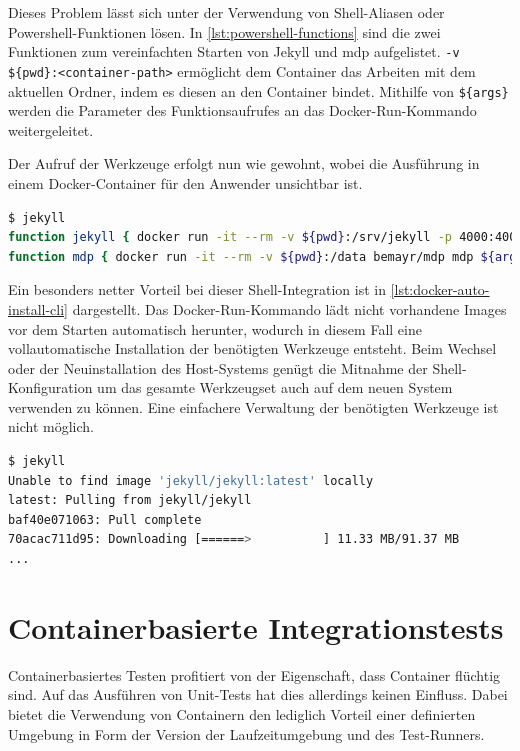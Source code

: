 Dieses Problem lässt sich unter der Verwendung von Shell-Aliasen oder Powershell-Funktionen lösen.
In \cref{lst:powershell-functions} sind die zwei Funktionen zum vereinfachten Starten von Jekyll und mdp aufgelistet.
\texttt{-v \$\{pwd\}:<container-path>} ermöglicht dem Container das Arbeiten mit dem aktuellen Ordner, indem es diesen an den Container bindet.
Mithilfe von \texttt{\$\{args\}} werden die Parameter des Funktionsaufrufes an das Docker-Run-Kommando weitergeleitet.

Der Aufruf der Werkzeuge erfolgt nun wie gewohnt, wobei die Ausführung in einem Docker-Container für den Anwender unsichtbar ist.

\begin{lstlisting}[caption=Powershell-Funktionen für Docker-Kommandos, language=bash, label=lst:powershell-functions]
$ jekyll
function jekyll { docker run -it --rm -v ${pwd}:/srv/jekyll -p 4000:4000 jekyll/jekyll /usr/local/bin/jekyll ${args} }
function mdp { docker run -it --rm -v ${pwd}:/data bemayr/mdp mdp ${args} }
\end{lstlisting}
Ein besonders netter Vorteil bei dieser Shell-Integration ist in \cref{lst:docker-auto-install-cli} dargestellt.
Das Docker-Run-Kommando lädt nicht vorhandene Images vor dem Starten automatisch herunter, wodurch in diesem Fall eine vollautomatische Installation der benötigten Werkzeuge entsteht.
Beim Wechsel oder der Neuinstallation des Host-Systems genügt die Mitnahme der Shell-Konfiguration um das gesamte Werkzeugset auch auf dem neuen System verwenden zu können.
Eine einfachere Verwaltung der benötigten Werkzeuge ist nicht möglich.

\begin{lstlisting}[caption=Automatische Installation der Docker-basierten CLI-Anwendungen, language=bash, label=lst:docker-auto-install-cli]
$ jekyll
Unable to find image 'jekyll/jekyll:latest' locally
latest: Pulling from jekyll/jekyll
baf40e071063: Pull complete
70acac711d95: Downloading [======>          ] 11.33 MB/91.37 MB
...
\end{lstlisting}

\section{Containerbasierte Integrationstests}
\label{sec:containerbasiertes-integrationstests}
Containerbasiertes Testen profitiert von der Eigenschaft, dass Container flüchtig sind.
Auf das Ausführen von Unit-Tests hat dies allerdings keinen Einfluss.
Dabei bietet die Verwendung von Containern den lediglich Vorteil einer definierten Umgebung in Form der Version der Laufzeitumgebung und des Test-Runners.

